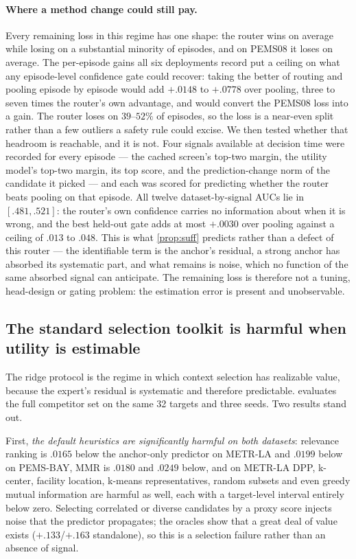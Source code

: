 \paragraph{Where a method change could still pay.} Every remaining loss in this
regime has one shape: the router wins on average while losing on a substantial
minority of episodes, and on PEMS08 it loses on average. The per-episode gains
all six deployments record put a ceiling on what any episode-level confidence
gate could recover: taking the better of routing and pooling episode by episode
would add $+.0148$ to $+.0778$ over pooling, three to seven times the router's
own advantage, and would convert the PEMS08 loss into a gain. The router loses
on $39$--$52\%$ of episodes, so the loss is a near-even split rather than a few
outliers a safety rule could excise. We then tested whether that headroom is reachable, and it is not.
Four signals available at decision time were recorded for every episode --- the
cached screen's top-two margin, the utility model's top-two margin, its top
score, and the prediction-change norm of the candidate it picked --- and each was
scored for predicting whether the router beats pooling on that episode. All
twelve dataset-by-signal AUCs lie in $[.481,.521]$: the router's own confidence
carries no information about when it is wrong, and the best held-out gate adds
at most $+.0030$ over pooling against a ceiling of $.013$ to $.048$. This is what
\cref{prop:suff} predicts rather than a defect of this router --- the
identifiable term is the anchor's residual, a strong anchor has absorbed its
systematic part, and what remains is noise, which no function of the same
absorbed signal can anticipate. The remaining loss is therefore not a tuning,
head-design or gating problem: the estimation error is present and
unobservable.

\subsection{The standard selection toolkit is harmful when utility is estimable}
\label{sec:ridge-matrix}

The ridge protocol is the regime in which context selection has realizable
value, because the expert's residual is systematic and therefore predictable.
 evaluates the full competitor set on the same 32
targets and three seeds. Two results stand out.

First, \emph{the default heuristics are significantly harmful on both datasets}:
relevance ranking is $.0165$ below the anchor-only predictor on METR-LA and
$.0199$ below on PEMS-BAY, MMR is $.0180$ and $.0249$ below, and on METR-LA
DPP, k-center, facility location, k-means representatives, random subsets and
even greedy mutual information are harmful as well, each with a target-level
interval entirely below zero. Selecting correlated or diverse candidates by a
proxy score injects noise that the predictor propagates; the oracles show that
a great deal of value exists ($+.133$/$+.163$ standalone), so this is a
selection failure rather than an absence of signal.

